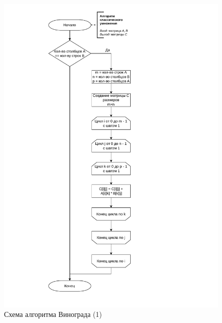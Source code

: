 \begin{figure}[h]
	\centering
	\includegraphics[height=0.9\textheight, page=2]{algo-scheme.pdf}
	\caption{Схема алгоритма Винограда (1)}
	\label{fig:vinograd}
\end{figure}

\clearpage

